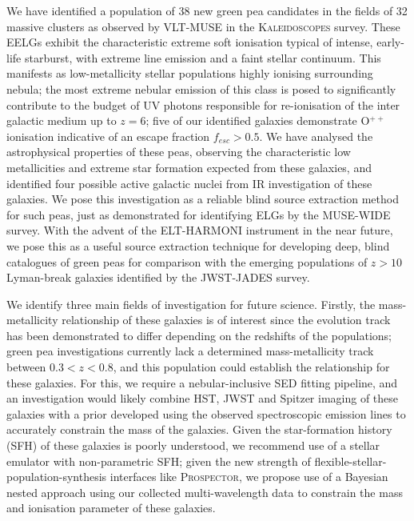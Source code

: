 \documentclass[fleqn,usenatbib]{mnras}
\begin{document}
We have identified a population of 38 new green pea candidates in the fields of 32 massive clusters as observed by VLT-MUSE in the \textsc{Kaleidoscopes} survey. These EELGs exhibit the characteristic extreme soft ionisation typical of intense, early-life starburst, with extreme line emission and a faint stellar continuum. This manifests as low-metallicity stellar populations highly ionising surrounding nebula; the most extreme nebular emission of this class is posed to significantly contribute to the budget of UV photons responsible for re-ionisation of the inter galactic medium up to $z=6$; five of our identified galaxies demonstrate O$^{++}$ ionisation indicative of an escape fraction $f_{esc}>0.5$. We have analysed the astrophysical properties of these peas, observing the characteristic low metallicities and extreme star formation expected from these galaxies, and identified four possible active galactic nuclei from IR investigation of these galaxies.  We pose this investigation as a reliable blind source extraction method for such peas, just as demonstrated for identifying ELGs by the \cite{musewide_description} MUSE-WIDE survey. With the advent of the ELT-HARMONI instrument in the near future, we pose this as a useful source extraction technique for developing deep, blind catalogues of green peas for comparison with the emerging populations of  $z>10$ Lyman-break galaxies identified by the JWST-JADES survey.

We identify three main fields of investigation for future science. Firstly, the mass-metallicity relationship of these galaxies is of interest since the evolution track has been demonstrated to differ depending on the redshifts of the populations; green pea investigations currently lack a determined mass-metallicity track between $0.3<z<0.8$, and this population could establish the relationship for these galaxies. For this, we require a nebular-inclusive SED fitting pipeline, and an investigation would likely combine HST, JWST and Spitzer imaging of these galaxies with a prior developed using the observed spectroscopic emission lines to accurately constrain the mass of the galaxies. Given the star-formation history (SFH) of these galaxies is poorly understood, we recommend use of a stellar emulator with non-parametric SFH; given the new strength of flexible-stellar-population-synthesis interfaces like \textsc{Prospector}, we propose use of a Bayesian nested approach using our collected multi-wavelength data to constrain the mass and ionisation parameter of these galaxies. 
\end{document}
